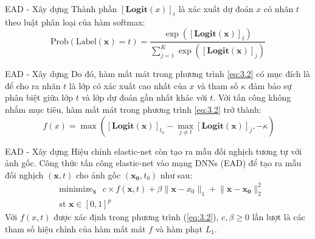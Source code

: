 \begin{frame}{EAD - Xây dựng}
    Thành phần $[\textbf{Logit}(x)]_t$ là xác xuất dự đoán $x$ có nhãn $t$ theo 
    luật phân loại của hàm softmax:
    \begin{equation}
        \label{eq:5}
        \text{Prob}(\text{Label}(\mathbf{x}) = t) = \frac{\exp([\textbf{Logit}(\mathbf{x})]_t)}{
            \sum_{j=1}^{K} \exp([\textbf{Logit}(\mathbf{x})]_j)
        }
    \end{equation}
\end{frame}

\begin{frame}{EAD - Xây dựng}
    Do đó, hàm mất mát trong phương trình \ref{eq:3.2} có mục đích là để cho ra nhãn $t$ là 
    lớp có xác xuất cao nhất của $x$ và tham số $\kappa$ đảm bảo sự phân biệt giữa lớp $t$
    và lớp dự đoán gần nhất khác với $t$. Với tấn công không nhắm mục tiêu, hàm mất mát trong 
    phương trình \ref{eq:3.2} trở thành:
    \begin{equation}
        \label{eq:3.4}\
        f(x) = \max { \left([\textbf{Logit}(\mathbf{x})]_{t_0} - 
        \max_{j \neq t} [\textbf{Logit}(\mathbf{x})]_j, -\kappa \right) }
    \end{equation}
\end{frame}

\begin{frame}{EAD - Xây dựng}
    Hiệu chỉnh 
    elastic-net còn tạo ra mẫu đối nghịch tương tự với ảnh gốc. Công thức tấn công elastic-net
    vào mạng DNNs (EAD) để tạo ra mẫu đối nghịch $(\mathbf{x},t)$ cho ảnh gốc $(\mathbf{x_0}, t_0)$ như sau:
    \begin{equation}
        \label{eq:3.5}
        \begin{split}
        &\text{minimize}_{\mathbf{x}} \text{ }
        c \times f(\mathbf{x}, t) + \beta \lVert \mathbf{x} - x_0 \rVert_1
        + \lVert \mathbf{x} - \mathbf{x_0} \rVert_2^2 \\
        &\text{st   } \mathbf{x} \in [0,1]^p
        \end{split}
    \end{equation}
    Với $f(x,t)$ được xác định trong phương trình (\ref{eq:3.2}), $c, \beta \geq 0$ lần lượt 
    là các tham số  hiệu chỉnh của hàm mất mát $f$ và hàm phạt $L_1$.
\end{frame}

